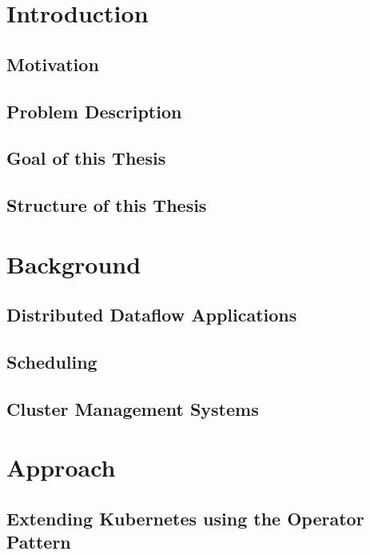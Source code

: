

\chapter{Introduction}
\section{Motivation}

\section{Problem Description}

\section{Goal of this Thesis}

\section{Structure of this Thesis}



\chapter{Background}
\section{Distributed Dataflow Applications}

\section{Scheduling}

\section{Cluster Management Systems}


\chapter{Approach}

\section{Extending Kubernetes using the Operator Pattern}

